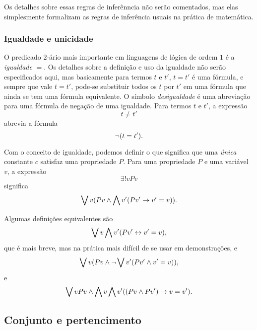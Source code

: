 Os detalhes sobre essas regras de inferênncia não serão comentados, mas elas simplesmente formalizam as regras de inferência usuais na prática de matemática.

\subsubsection{Igualdade e unicidade}

O predicado $2$-ário mais importante em linguagens de lógica de ordem $1$ é a \emph{igualdade} $=$. Os detalhes sobre a definição e uso da igualdade não serão especificados aqui, mas basicamente para termos $t$ e $t'$, $t=t'$ é uma fórmula, e sempre que vale $t=t'$, pode-se substituir todos os $t$ por $t'$ em uma fórmula que ainda se tem uma fórmula equivalente. O símbolo \emph{desigualdade} é uma abreviação para uma fórmula de negação de uma igualdade. Para termos $t$ e $t'$, a expressão
	\begin{equation*}
	t \neq t'
	\end{equation*}
abrevia a fórmula
	\begin{equation*}
	\lnot(t = t').
	\end{equation*}

Com o conceito de igualdade, podemos definir o que significa que uma \emph{única} constante $c$ satisfaz uma propriedade $P$. Para uma propriedade $P$ e uma variável $v$, a expressão
	\begin{equation*}
	\exists!v Pv
	\end{equation*}
significa
	\begin{equation*}
	\bigvee\nolimits v (Pv \land \bigwedge\nolimits v'(Pv' \rightarrow v' = v)).
	\end{equation*}

Algumas definições equivalentes são
	\begin{equation*}
	\bigvee\nolimits v \bigwedge\nolimits v' (Pv' \leftrightarrow v'=v),
	\end{equation*}
que é mais breve, mas na prática mais difícil de se usar em demonstrações, e
	\begin{equation*}
	\exists v (Pv \lee \lnao\exists v'(Pv' \lee v' \neq v)),
	\end{equation*}
e
	\begin{equation*}
	\bigvee\nolimits v Pv \land \bigwedge\nolimits v \bigwedge\nolimits v' ((Pv \land Pv') \rightarrow v=v').
	\end{equation*}

\subsection{Conjunto e pertencimento}

